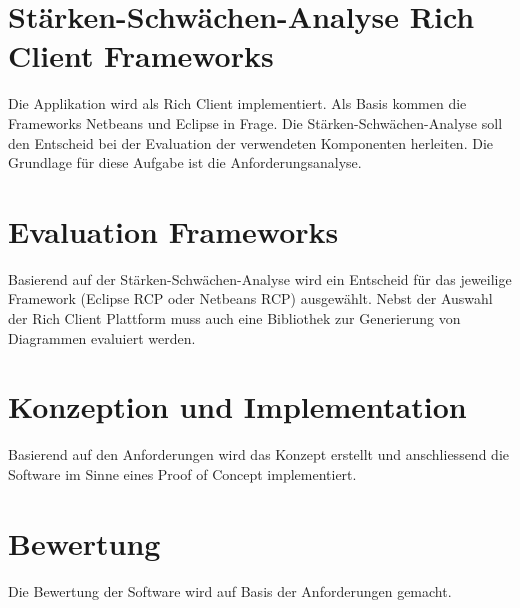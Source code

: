 \section{Stärken-Schwächen-Analyse Rich Client Frameworks}
Die Applikation wird als Rich Client implementiert. Als Basis kommen die Frameworks Netbeans und Eclipse in Frage. Die Stärken-Schwächen-Analyse soll den Entscheid bei der Evaluation der verwendeten Komponenten herleiten. Die Grundlage für diese Aufgabe ist die Anforderungsanalyse.

\section{Evaluation Frameworks}
Basierend auf der Stärken-Schwächen-Analyse wird ein Entscheid für das jeweilige Framework (Eclipse RCP oder Netbeans RCP)  ausgewählt. Nebst der Auswahl der Rich Client Plattform muss auch eine Bibliothek zur Generierung von Diagrammen evaluiert werden.

\section{Konzeption und Implementation}
Basierend auf den Anforderungen wird das Konzept erstellt und anschliessend die Software im Sinne eines Proof of Concept implementiert. 

\section{Bewertung}
Die Bewertung der Software wird auf Basis der Anforderungen gemacht.



